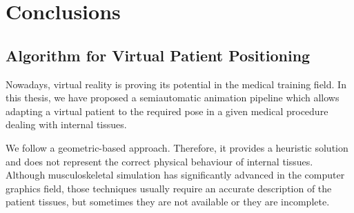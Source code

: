\chapter{Conclusions}
\label{cap:conclu}

\section{Algorithm for Virtual Patient Positioning}
\label{conclu:posing}

Nowadays, virtual reality is proving its potential in the medical training  field.  
In this thesis, we have proposed a semiautomatic animation pipeline which allows adapting a virtual patient to the required pose in a given medical procedure dealing with internal tissues.  

We follow a geometric-based approach. Therefore, it provides a heuristic solution and does not represent the correct physical behaviour of internal tissues. Although musculoskeletal  simulation  has  significantly  advanced in  the  computer  graphics field, those techniques usually require an accurate description of the patient tissues, but sometimes they are not available or they are incomplete.


